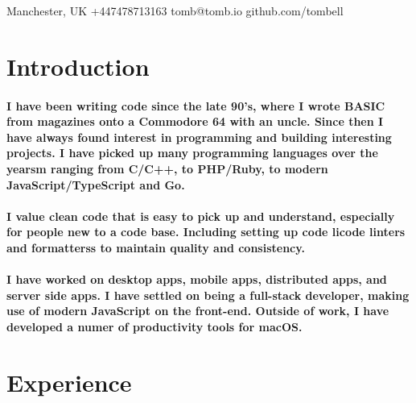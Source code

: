 \documentclass[a4paper]{article}
\author{Tom Bell}
\renewcommand{\maketitle}{
  \begin{center}
    \huge{\textbf\theauthor}
  \end{center}
}
\begin{document}
\maketitle

\begin{center}
  \raisebox{0\height}{\small\faMapMarker} Manchester, UK
  \hspace{1 cm}
  \raisebox{-0.1\height}{\small\faMobile} +447478713163
  \hspace{1 cm}
  \raisebox{-0.1\height}{\small\faEnvelope} tomb@tomb.io
  \hspace{1 cm}
  \raisebox{-0.1\height}{\small\faGithubAlt} github.com/tombell
\end{center}

\section{Introduction}
\paragraph{I have been writing code since the late 90's, where I wrote BASIC from magazines onto a Commodore 64 with an uncle. Since then I have always found interest in programming and building interesting projects. I have picked up many programming languages over the yearsm ranging from C/C++, to PHP/Ruby, to modern JavaScript/TypeScript and Go.}

\paragraph{I value clean code that is easy to pick up and understand, especially for people new to a code base. Including setting up code licode linters and formatterss to maintain quality and consistency.}

\paragraph{I have worked on desktop apps, mobile apps, distributed apps, and server side apps. I have settled on being a full-stack developer, making use of modern JavaScript on the front-end. Outside of work, I have developed a numer of productivity tools for macOS.}

\section{Experience}
\end{document}
